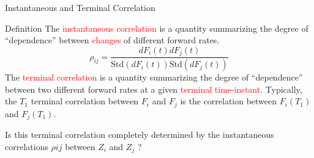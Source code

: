 \documentclass{beamer}
\begin{document}
\begin{frame}{Instantaneous and Terminal Correlation}
	
	\begin{block}{Definition}
		The \textcolor{red}{instantaneous correlation} is a quantity summarizing the degree of “dependence” between \textcolor{red}{changes} of different forward rates.
		\begin{equation*}
			\rho_{ij} = \frac{dF_i(t) dF_j(t)}{\text{Std}(dF_i(t))\text{Std}(dF_j(t))}
		\end{equation*}
		The \textcolor{red}{terminal correlation} is a quantity summarizing the degree of “dependence” between two different forward rates at a given  \textcolor{red}{terminal time-instant}. Typically, the $T_1$ terminal correlation between $F_i$ and $F_j$ is the correlation between $F_i(T_1)$ and $F_j(T_1)$.
	\end{block}
	Is this terminal correlation completely determined by the instantaneous correlations $\rho{ij}$ between $Z_i$ and $Z_j$ ?
\end{frame}
\end{document}
